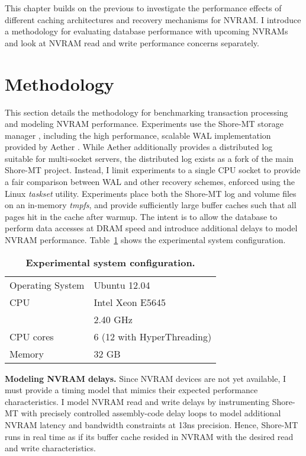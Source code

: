 This chapter builds on the previous to investigate the performance effects of different caching architectures and recovery mechanisms for NVRAM.
I introduce a methodology for evaluating database performance with upcoming NVRAMs and look at NVRAM read and write performance concerns separately.

\section{Methodology}
\label{sec:OLTP_design:Methodology}

This section details the methodology for benchmarking transaction processing and modeling NVRAM performance.
Experiments use the Shore-MT storage manager \cite{JohnsonPandis09}, including the high performance, scalable WAL implementation provided by Aether \cite{JohnsonPandis10}.
While Aether additionally provides a distributed log suitable for multi-socket servers, the distributed log exists as a fork of the main Shore-MT project.
Instead, I limit experiments to a single CPU socket to provide a fair comparison between WAL and other recovery schemes, enforced using the Linux \emph{taskset} utility.
Experiments place both the Shore-MT log and volume files on an in-memory \emph{tmpfs}, and provide sufficiently large buffer caches such that all pages hit in the cache after warmup.
The intent is to allow the database to perform data accesses at DRAM speed and introduce additional delays to model NVRAM performance.
Table~\ref{table::Specs} shows the experimental system configuration.

\begin{table}
  \centering
  \begin{tabular}{l l}
    \hline
    Operating System & Ubuntu 12.04 \\
    CPU & Intel Xeon E5645 \\
    & 2.40 GHz \\
    CPU cores & 6 (12 with HyperThreading) \\
    Memory & 32 GB \\
    \hline
  \end{tabular}
  \caption{\textbf{Experimental system configuration.}}
  \label{table::Specs}
\end{table}

\textbf{Modeling NVRAM delays.}
Since NVRAM devices are not yet available, I must provide a timing model that mimics their expected performance characteristics.
I model NVRAM read and write delays by instrumenting Shore-MT with precisely controlled assembly-code delay loops to model additional NVRAM latency and bandwidth constraints at 13ns precision.
Hence, Shore-MT runs in real time as if its buffer cache resided in NVRAM with the desired read and write characteristics.

